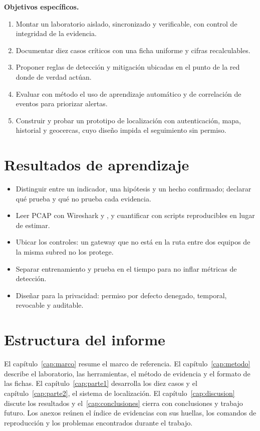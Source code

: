 \textbf{Objetivos específicos.}
\begin{enumerate}
\item Montar un laboratorio aislado, sincronizado y verificable, con control de integridad de la evidencia.
\item Documentar diez casos críticos con una ficha uniforme y cifras recalculables.
\item Proponer reglas de detección y mitigación ubicadas en el punto de la red donde de verdad actúan.
\item Evaluar con método el uso de aprendizaje automático y de correlación de eventos para priorizar alertas.
\item Construir y probar un prototipo de localización con autenticación, mapa, historial y geocercas, cuyo diseño impida el seguimiento sin permiso.
\end{enumerate}

\section{Resultados de aprendizaje}
\begin{itemize}
\item Distinguir entre un indicador, una hipótesis y un hecho confirmado; declarar qué prueba y qué no prueba cada evidencia.
\item Leer PCAP con Wireshark y , y cuantificar con scripts reproducibles en lugar de estimar.
\item Ubicar los controles: un gateway que no está en la ruta entre dos equipos de la misma subred no los protege.
\item Separar entrenamiento y prueba en el tiempo para no inflar métricas de detección.
\item Diseñar para la privacidad: permiso por defecto denegado, temporal, revocable y auditable.
\end{itemize}

\section{Estructura del informe}
El capítulo~\ref{cap:marco} resume el marco de referencia. El capítulo~\ref{cap:metodo} describe el laboratorio, las herramientas, el método de evidencia y el formato de las fichas. El capítulo~\ref{cap:parte1} desarrolla los diez casos y el capítulo~\ref{cap:parte2}, el sistema de localización. El capítulo~\ref{cap:discusion} discute los resultados y el~\ref{cap:conclusiones} cierra con conclusiones y trabajo futuro. Los anexos reúnen el índice de evidencias con sus huellas, los comandos de reproducción y los problemas encontrados durante el trabajo.

